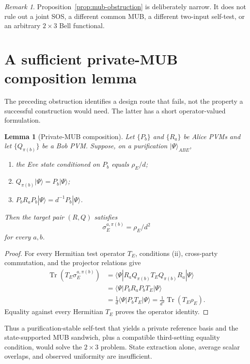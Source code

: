 \documentclass[11pt]{article}
\newtheorem{lemma}[theorem]{Lemma}
\theoremstyle{remark}
\newtheorem{remark}[theorem]{Remark}
\newcommand{\Tr}{\operatorname{Tr}}
\begin{document}
\begin{remark}
Proposition~\ref{prop:mub-obstruction} is deliberately narrow.  It does not
rule out a joint SOS, a different common MUB, a different two-input
self-test, or an arbitrary \(2\times3\) Bell functional.
\end{remark}

\section{A sufficient private-MUB composition lemma}

The preceding obstruction identifies a design route that fails, not the
property a successful construction would need.  The latter has a short
operator-valued formulation.

\begin{lemma}[Private-MUB composition]\label{lem:private-mub}
Let \(\{P_b\}\) and \(\{R_a\}\) be Alice PVMs and let
\(\{Q_{\pi(b)}\}\) be a Bob PVM.  Suppose, on a purification
\(\lvert\Psi\rangle_{ABE}\),
\begin{enumerate}[label=(\roman*),leftmargin=1.7em]
\item the Eve state conditioned on \(P_b\) equals \(\rho_E/d\);
\item \(Q_{\pi(b)}|\Psi\rangle=P_b|\Psi\rangle\);
\item
\(P_bR_aP_b|\Psi\rangle=d^{-1}P_b|\Psi\rangle\).
\end{enumerate}
Then the target pair \((R,Q)\) satisfies
\[
\sigma_E^{a,\pi(b)}=\rho_E/d^2
\]
for every \(a,b\).
\end{lemma}

\begin{proof}
For every Hermitian test operator \(T_E\), conditions (ii), cross-party
commutation, and the projector relations give
\[
\begin{aligned}
\Tr(T_E\sigma_E^{a,\pi(b)})
&=
\langle\Psi|R_aQ_{\pi(b)}T_EQ_{\pi(b)}R_a|\Psi\rangle\\
&=
\langle\Psi|P_bR_aP_bT_E|\Psi\rangle\\
&=
\frac1d\langle\Psi|P_bT_E|\Psi\rangle
=\frac1{d^2}\Tr(T_E\rho_E).
\end{aligned}
\]
Equality against every Hermitian \(T_E\) proves the operator identity.
\end{proof}

Thus a purification-stable self-test that yields a private reference basis
and the state-supported MUB sandwich, plus a compatible third-setting
equality condition, would solve the \(2\times3\) problem.  State extraction
alone, average scalar overlaps, and observed uniformity are insufficient.
\end{document}

